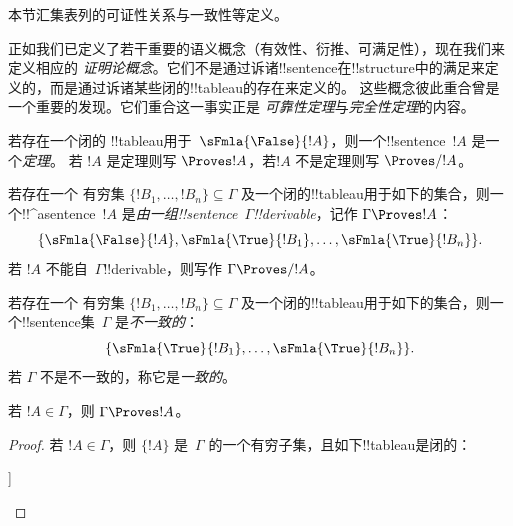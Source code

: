 \documentclass[../../../include/open-logic-section]{subfiles}
\begin{document}
      {}
      {}


\begin{editorial}
本节汇集表列的可证性关系与一致性等定义。
\end{editorial}

\begin{explain}
正如我们已定义了若干重要的语义概念（有效性、衍推、可满足性），现在我们来定义相应的
\emph{证明论概念}。它们不是通过诉诸!!{sentence}在!!{structure}中的满足来定义的，而是通过诉诸某些闭的!!{tableau}的存在来定义的。
这些概念彼此重合曾是一个重要的发现。它们重合这一事实正是
\emph{可靠性定理}与\emph{完全性定理}的内容。
\end{explain}


\begin{defn}[定理]
若存在一个闭的
!!{tableau}用于~$\sFmla{\False}{!A}$，则一个!!{sentence}~$!A$ 是一个\emph{定理}。
若 $!A$
是定理则写 $\Proves !A$，若$!A$ 不是定理则写 $\Proves/ !A$。
\end{defn}

\begin{defn}[!!^{derivability}]
若存在一个
有穷集 $\{!B_1, \dots, !B_n\} \subseteq \Gamma$
及一个闭的!!{tableau}用于如下的集合，则一个!!^a{sentence}~$!A$ 是\emph{由一组!!{sentence}~$\Gamma$!!{derivable}}，记作 $\Gamma \Proves !A$：
\[
\{
  \sFmla{\False}{!A},
  \sFmla{\True}{!B_1}, \dots,
  \sFmla{\True}{!B_n}
  \}.
\]
若 $!A$ 不能自~$\Gamma$!!{derivable}，则写作 $\Gamma \Proves/
!A$。
\end{defn}

\begin{defn}[一致性]
若存在一个
有穷集 $\{!B_1, \dots, !B_n\} \subseteq \Gamma$ 及一个闭的!!{tableau}用于如下的集合，则一个!!{sentence}集~$\Gamma$ 是\emph{不一致的}：
\[
\{
  \sFmla{\True}{!B_1}, \dots,
  \sFmla{\True}{!B_n}
  \}.
\]
若 $\Gamma$ 不是不一致的，称它是\emph{一致的}。
\end{defn}

\begin{prop}[自反性]
若 $!A \in \Gamma$，则 $\Gamma \Proves !A$。
\end{prop}

\begin{proof}
若 $!A \in \Gamma$，则 $\{!A\}$ 是~$\Gamma$ 的一个有穷子集，且如下!!{tableau}是闭的：
\begin{oltableau}
  [\sFmla{\False}{\formula{A}}, just = \TAss
    [\sFmla{\True}{\formula{A}}, just = \TAss,close]
  ]
\end{oltableau}
\end{proof}
\end{document}
